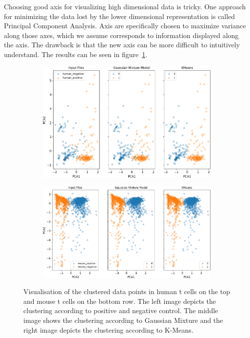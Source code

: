 Choosing good axis for visualizing high dimensional data is tricky. One approach for minimizing the data lost by the lower dimensional representation is called Principal Component Analysis. Axis are specifically chosen to maximize variance along those axes, which we assume corresponds to information displayed along the axis. The drawback is that the new axis can be more difficult to intuitively understand. The results can be seen in figure~\ref{fig:vis_output_seperate}.
	
\begin{figure}
	\centering
	\begin{subfigure}{\linewidth}
		\includegraphics[width=\textwidth]{fig/separate_human}
	\end{subfigure}
	\hfill
	\vspace{0.5cm}
	\begin{subfigure}{\linewidth}
		\includegraphics[width=\textwidth]{fig/separate_mouse}
	\end{subfigure}
	
	\caption{Visualisation of the clustered data points in human t cells on the top and mouse t cells on the bottom row. The left image depicts the clustering according to positive and negative control. The middle image shows the clustering according to Gaussian Mixture and the right image depicts the clustering according to K-Means.}
	\label{fig:vis_output_seperate}
\end{figure}

